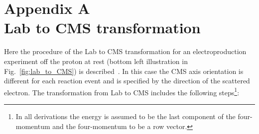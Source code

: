\appendix

\renewcommand{\thechapter}{A}
\makeatletter
\renewcommand{\theequation}{\thechapter.\@arabic\c@equation}
\makeatother
\chapter*{\LARGE Appendix A \\\tiny\vspace{-0.4\baselineskip} \LARGE Lab to CMS transformation}
\label{app_lab_cms_trans}



Here the procedure of the Lab to CMS transformation for an electroproduction experiment off the proton at rest (bottom left illustration in Fig.~\ref{fig:lab_to_CMS}) is described~\cite{Fed_an_note:2017}. In this case the CMS axis orientation is different for each reaction event and is specified by the direction of the scattered electron. The transformation from Lab to CMS includes the following steps\footnote[1]{In all derivations the energy is assumed to be the last component of the four-momentum and the four-momentum to be a row vector.}:%

